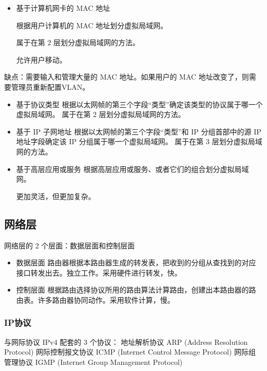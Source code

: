 \documentclass[11pt]{article}
\begin{document}
\begin{enumerate}
\begin{enumerate}
\begin{enumerate}
\begin{enumerate}
\begin{itemize}
\item 基于计算机网卡的 MAC 地址

根据用户计算机的 MAC 地址划分虚拟局域网。

属于在第 2 层划分虚拟局域网的方法。

允许用户移动。
\end{itemize}

缺点：需要输入和管理大量的 MAC 地址。如果用户的 MAC 地址改变了，则需要管理员重新配置VLAN。

\begin{itemize}
\item 基于协议类型
根据以太网帧的第三个字段“类型”确定该类型的协议属于哪一个虚拟局域网。
属于在第 2 层划分虚拟局域网的方法。

\item 基于 IP 子网地址
根据以太网帧的第三个字段“类型”和 IP 分组首部中的源 IP 地址字段确定该 IP 分组属于哪一个虚拟局域网。
属于在第 3 层划分虚拟局域网的方法。

\item 基于高层应用或服务
根据高层应用或服务、或者它们的组合划分虚拟局域网。

更加灵活，但更加复杂。
\end{itemize}
\end{enumerate}
\end{enumerate}
\end{enumerate}
\end{enumerate}

\subsection{网络层}
\label{sec:orgc9b2aad}

网络层的 2 个层面：数据层面和控制层面


\begin{itemize}
\item 数据层面
路由器根据本路由器生成的转发表，把收到的分组从查找到的对应接口转发出去。独立工作。采用硬件进行转发，快。
\item 控制层面
根据路由选择协议所用的路由算法计算路由，创建出本路由器的路由表。许多路由器协同动作。采用软件计算，慢。
\end{itemize}

\subsubsection{IP协议}
\label{sec:org0b40b52}

与网际协议 IPv4 配套的 3 个协议：
地址解析协议 ARP (Address Resolution Protocol)
网际控制报文协议 ICMP (Internet Control Message Protocol)
网际组管理协议 IGMP (Internet Group Management Protocol)
\end{document}
